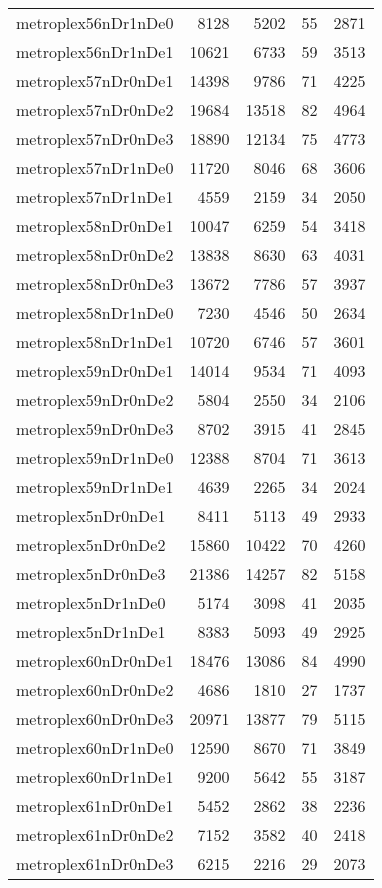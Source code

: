 \begin{longtable}{lrrrr}
metroplex56nDr1nDe0 & 8128 & 5202 & 55 & 2871 \\
metroplex56nDr1nDe1 & 10621 & 6733 & 59 & 3513 \\
metroplex57nDr0nDe1 & 14398 & 9786 & 71 & 4225 \\
metroplex57nDr0nDe2 & 19684 & 13518 & 82 & 4964 \\
metroplex57nDr0nDe3 & 18890 & 12134 & 75 & 4773 \\
metroplex57nDr1nDe0 & 11720 & 8046 & 68 & 3606 \\
metroplex57nDr1nDe1 & 4559 & 2159 & 34 & 2050 \\
metroplex58nDr0nDe1 & 10047 & 6259 & 54 & 3418 \\
metroplex58nDr0nDe2 & 13838 & 8630 & 63 & 4031 \\
metroplex58nDr0nDe3 & 13672 & 7786 & 57 & 3937 \\
metroplex58nDr1nDe0 & 7230 & 4546 & 50 & 2634 \\
metroplex58nDr1nDe1 & 10720 & 6746 & 57 & 3601 \\
metroplex59nDr0nDe1 & 14014 & 9534 & 71 & 4093 \\
metroplex59nDr0nDe2 & 5804 & 2550 & 34 & 2106 \\
metroplex59nDr0nDe3 & 8702 & 3915 & 41 & 2845 \\
metroplex59nDr1nDe0 & 12388 & 8704 & 71 & 3613 \\
metroplex59nDr1nDe1 & 4639 & 2265 & 34 & 2024 \\
metroplex5nDr0nDe1 & 8411 & 5113 & 49 & 2933 \\
metroplex5nDr0nDe2 & 15860 & 10422 & 70 & 4260 \\
metroplex5nDr0nDe3 & 21386 & 14257 & 82 & 5158 \\
metroplex5nDr1nDe0 & 5174 & 3098 & 41 & 2035 \\
metroplex5nDr1nDe1 & 8383 & 5093 & 49 & 2925 \\
metroplex60nDr0nDe1 & 18476 & 13086 & 84 & 4990 \\
metroplex60nDr0nDe2 & 4686 & 1810 & 27 & 1737 \\
metroplex60nDr0nDe3 & 20971 & 13877 & 79 & 5115 \\
metroplex60nDr1nDe0 & 12590 & 8670 & 71 & 3849 \\
metroplex60nDr1nDe1 & 9200 & 5642 & 55 & 3187 \\
metroplex61nDr0nDe1 & 5452 & 2862 & 38 & 2236 \\
metroplex61nDr0nDe2 & 7152 & 3582 & 40 & 2418 \\
metroplex61nDr0nDe3 & 6215 & 2216 & 29 & 2073 \\

\end{longtable}
